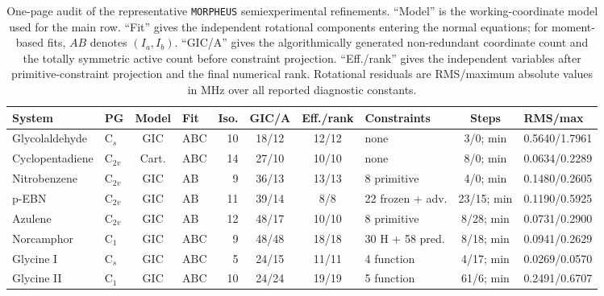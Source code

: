 \begin{table}
\caption{One-page audit of the representative \texttt{MORPHEUS}
semiexperimental refinements. ``Model'' is the working-coordinate model used
for the main row. ``Fit'' gives the independent rotational components entering
the normal equations; for moment-based fits, $AB$ denotes $(I_a,I_b)$. ``GIC/A''
gives the algorithmically generated non-redundant coordinate count and the
totally symmetric active count before constraint projection. ``Eff./rank''
gives the independent variables after primitive-constraint projection and the
final numerical rank. Rotational residuals are RMS/maximum absolute values in
MHz over all reported diagnostic constants.}
\label{tab:benchmark-summary}
\scriptsize
\setlength{\tabcolsep}{2.0pt}
\begin{tabular}{@{}llclrcclcl@{}}
\toprule
System & PG & Model & Fit & Iso. & GIC/A & Eff./rank & Constraints & Steps & RMS/max \\
\midrule
Glycolaldehyde & C$_s$ & GIC & ABC & 10 & 18/12 & 12/12 & none & 3/0; min & 0.5640/1.7961 \\
Cyclopentadiene & C$_{2v}$ & Cart. & ABC & 14 & 27/10 & 10/10 & none & 8/0; min & 0.0634/0.2289 \\
Nitrobenzene & C$_{2v}$ & GIC & AB & 9 & 36/13 & 13/13 & 8 primitive & 4/0; min & 0.1480/0.2605 \\
p-EBN & C$_{2v}$ & GIC & AB & 11 & 39/14 & 8/8 & 22 frozen + adv. & 23/15; min & 0.1190/0.5925 \\
Azulene & C$_{2v}$ & GIC & AB & 12 & 48/17 & 10/10 & 8 primitive & 8/28; min & 0.0731/0.2900 \\
Norcamphor & C$_1$ & GIC & ABC & 9 & 48/48 & 18/18 & 30 H + 58 pred. & 8/18; min & 0.0941/0.2629 \\
Glycine I & C$_s$ & GIC & ABC & 5 & 24/15 & 11/11 & 4 function & 4/17; min & 0.0269/0.0570 \\
Glycine II & C$_1$ & GIC & ABC & 10 & 24/24 & 19/19 & 5 function & 61/6; min & 0.2491/0.6707 \\
\bottomrule
\end{tabular}
\end{table}
